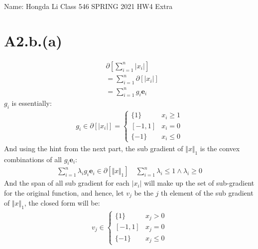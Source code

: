 \documentclass[]{article}
\begin{document}
\begin{center}
    Name: Hongda Li \quad Class 546 SPRING 2021 \quad HW4 Extra
\end{center}
\section*{A2.b.(a)}
    \begin{align*}\tag{a2.b.a.1}\label{eqn:a2.b.a.1}
        & \partial\left[\sum_{i = 1}^{n} |x_i|\right] 
        \\
        &= \sum_{i = 1}^{n} \partial[|x_i|]
        \\
        &= \sum_{i = 1}^{n} g_i\mathbf{e}_i 
    \end{align*}
    $g_i$ is essentially: 
    \begin{align*}\tag{a2.b.a.2}\label{eqn:a2.b.a.2}
        g_i \in \partial[|x_i|] = \begin{cases}
            \{1\} & x_i \ge 1
            \\
            [-1, 1] & x_i = 0
            \\
            \{-1\} & x_i \le 0
        \end{cases}                
    \end{align*}
    And using the hint from the next part, the sub gradient of $\Vert x\Vert_1$ is the convex combinations of all $g_i\mathbf{e}_i$: 
    \begin{align*}\tag{a2.b.a.3}\label{eqn:a2.b.a.3}
        \sum_{i = 1}^{n}\lambda_i g_i\mathbf{e}_i \in \partial[\Vert x\Vert_1] \quad 
        \sum_{i=1}^{n}\lambda_i \le 1 \wedge \lambda_i \ge 0
    \end{align*}
    And the span of all sub gradient for each $|x_i|$ will make up the set of sub-gradient for the original function, and hence, let $v_j$ be the $j$ th element of the sub gradient of $\Vert x\Vert_1$, the closed form will be: 
    \begin{align*}\tag{A2.b.1.3}\label{eqn:A2.b.1.3}
        v_j \in \begin{cases}
            \{1\} & x_j > 0 
            \\
            [-1 ,1] & x_j = 0
            \\
            \{-1\} & x_j \le 0
        \end{cases}
    \end{align*}
\end{document}
